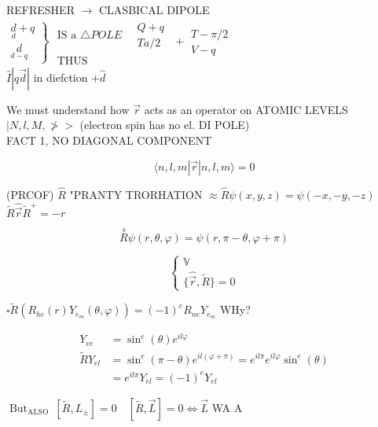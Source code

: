 REFRESHER $\rightarrow$ CLASBICAL DIPOLE\\
$\left.\begin{array}{l}\underset{d}{d}+q \\ \underset{d-q}{d}\end{array}\right\} \begin{gathered}\text { IS a } \triangle P O L E \quad \begin{array}{l}Q+q \\ T a / 2\end{array} \\ \text { THUS }\end{gathered}+\begin{gathered}T-\pi / 2 \\ V-q\end{gathered}$\\
$\hat{I}|q \vec{d}|$ in diefction $+\hat{d}$

We must understand how $\vec{r}$ acts as an operator on ATOMIC LEVELS $\mid N, l, M, \ngtr>$ (electron spin has no el. DI POLE)\\
FACT 1, NO DIAGONAL COMPONENT

$$
\langle n, l, m| \vec{r}|n, l, m\rangle=0
$$

(PRCOF) $\hat{R}$ "PRANTY TRORHATION $\approx \hat{R} \psi(x, y, z)=\psi(-x,-y,-z)$\\
$\tilde{R} \hat{\vec{r}} \tilde{R}^{+}=-r$

$$
\stackrel{s}{R} \psi(r, \theta, \varphi)=\psi(r, \pi-\theta, \varphi+\pi)
$$

$$
\left\{\begin{array}{c}
\mathbb{V} \\
\{\hat{\vec{r}}, \tilde{R}\}=0
\end{array}\right.
$$

$\square \tilde{R}\left(R_{h e}(r) Y_{e_{m}}(\theta, \varphi)\right)=(-1)^{e} R_{n e} Y_{e_{m}}$ WHy?

$$
\begin{aligned}
Y_{e e} & =\sin ^{e}(\theta) e^{i l \varphi} \\
\tilde{R} Y_{e l} & =\sin ^{e}(\pi-\theta) e^{i l(\varphi+\pi)}=e^{i l \pi} e^{i l \varphi} \sin ^{e}(\theta) \\
& =e^{i l \pi} Y_{e l}=(-1)^{e} Y_{e l}
\end{aligned}
$$

$\operatorname{But}_{\text {ALSO }}\left[\tilde{R}, L_{ \pm}\right]=0 \quad[\tilde{R}, \vec{L}]=0 \Leftrightarrow \vec{L}$ WA A

